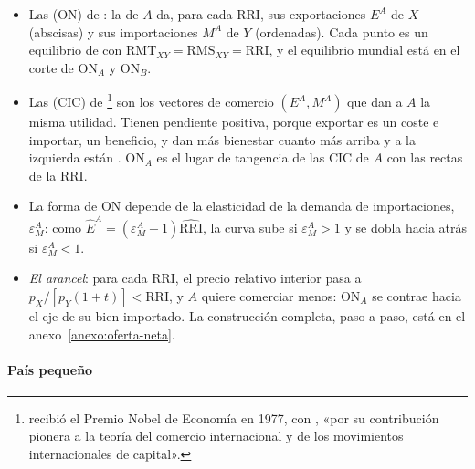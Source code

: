 \documentclass[11pt]{article}
\begin{document}
\begin{itemize}
\item Las  (ON) de \textcite{Marshall1879Pure} : la de $A$ da, para cada RRI, sus exportaciones $E^A$ de $X$ (abscisas) y sus importaciones $M^A$ de $Y$ (ordenadas). Cada punto es un equilibrio de  con $\mathrm{RMT}_{XY}=\mathrm{RMS}_{XY}=\mathrm{RRI}$, y el equilibrio mundial está en el corte de ON$_A$ y ON$_B$.
\item Las  (CIC) de \textcite{Meade1952Geometry}\footnote{ recibió el Premio Nobel de Economía en 1977, con , «por su contribución pionera a la teoría del comercio internacional y de los movimientos internacionales de capital»\nocite{Nobel1977MeadeOhlin}.} son los vectores de comercio $(E^A,M^A)$ que dan a $A$ la misma utilidad. Tienen pendiente positiva, porque exportar es un coste e importar, un beneficio, y dan más bienestar cuanto más arriba y a la izquierda están . ON$_A$ es el lugar de tangencia de las CIC de $A$ con las rectas de la RRI.
\item La forma de ON depende de la elasticidad de la demanda de importaciones, $\varepsilon^A_M$: como $\hat E^A=(\varepsilon^A_M-1)\widehat{\mathrm{RRI}}$, la curva sube si $\varepsilon^A_M>1$ y se dobla hacia atrás si $\varepsilon^A_M<1$.
\item \emph{El arancel}: para cada RRI, el precio relativo interior pasa a $p_X/[p_Y(1+t)]<\mathrm{RRI}$, y $A$ quiere comerciar menos: ON$_A$ se contrae hacia el eje de su bien importado. La construcción completa, paso a paso, está en el anexo~\ref{anexo:oferta-neta}.
\end{itemize}

\paragraph{País pequeño}
\end{document}
